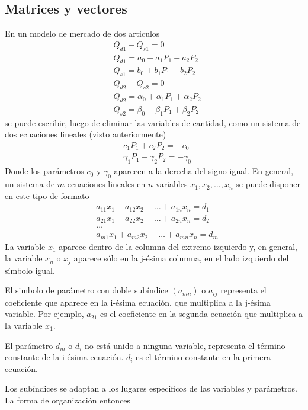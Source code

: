\subsection{Matrices y vectores}

En un modelo de mercado de dos articulos 
$$
\begin{aligned}
& Q_{d1}-Q_{s1}=0 \\
& Q_{d1}=a_0+a_1P_1+a_2P_2 \\ 
& Q_{s1}=b_0+b_1P_1+b_2P_2 \\
& Q_{d2}-Q_{s2}=0 \\
& Q_{d2}=\alpha_0+\alpha_1P_1+\alpha_2P_2 \\
& Q_{s2}=\beta_0+\beta_1P_1+\beta_2P_2
\end{aligned}
$$
se puede escribir, luego de eliminar las variables de cantidad, como un sistema de dos ecuaciones lineales (visto anteriormente)
$$
\begin{aligned}
&c_1P_1+c_2P_2=-c_0 \\ 
&\gamma_1P_1+\gamma_2P_2=-\gamma_0
\end{aligned}
$$
Donde los parámetros \(c_0\) y \(\gamma_0\) aparecen a la derecha del signo igual. En general, un sistema de \(m\) ecuaciones lineales en \(n\) variables \(x_1,x_2,\dots,x_n\) se puede disponer en este tipo de formato
$$
\begin{aligned}
& a_{11}x_1+a_{12}x_2+\dots+a_{1n}x_n = d_1\\ 
& a_{21}x_1+a_{22}x_2+\dots+a_{2n}x_n = d_2 \\
& \dots \\
& a_{m1}x_1+a_{m2}x_2+\dots+a_{mn}x_n = d_m
\end{aligned}
$$
La variable \(x_1\) aparece dentro de la columna del extremo izquierdo y, en general, la variable \(x_n\) o \(x_j\) aparece sólo en la j-ésima columna, en el lado izquierdo del símbolo igual. 

El simbolo de parámetro con doble subíndice \((a_{mn})\) o \(a_{ij}\) representa el coeficiente que aparece en la i-ésima ecuación, que multiplica a la j-ésima variable. Por ejemplo, \(a_{21}\) es el coeficiente en la segunda ecuación que multiplica a la variable \(x_1\). 

El parámetro \(d_m\) o \(d_i\) no está unido a ninguna variable, representa el término constante de la i-ésima ecuación. \(d_i\) es el término constante en la primera ecuación. 

Los subíndices se adaptan a los lugares especificos de las variables y parámetros. La forma de organización entonces

